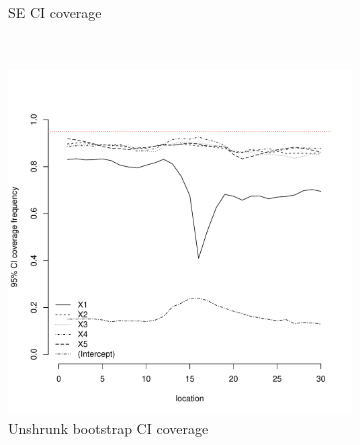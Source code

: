 \documentclass[authoryear, review, 11pt]{elsarticle}
\begin{document}
\begin{figure}
\begin{subfigure}[b]{0.45\textwidth}
		\caption{SE CI coverage}
	\end{subfigure}%
	\\%
	\begin{subfigure}[b]{0.45\textwidth}
	\centering
		\includegraphics[width=\textwidth]{../../figures/simulation/15.17.profile_unshrunk_bootstrap_coverage.pdf}
		\caption{Unshrunk bootstrap CI coverage}
	\end{subfigure}%
	~ %
	\begin{subfigure}[b]{0.45\textwidth}
	\centering

\end{subfigure}
\end{figure}
\end{document}
